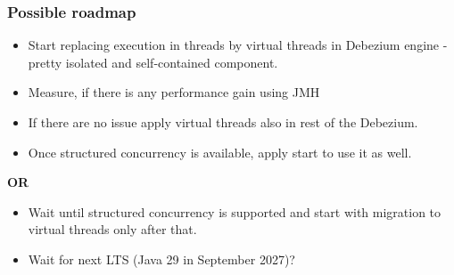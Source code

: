\documentclass[10pt,utf8]{beamer}
\begin{document}
\begin{frame}
    \frametitle{Possible roadmap}
    \begin{itemize}
        \item Start replacing execution in threads by virtual threads in Debezium engine - pretty isolated and self-contained component.
        \item Measure, if there is any performance gain using JMH
        \item If there are no issue apply virtual threads also in rest of the Debezium.
        \item Once structured concurrency is available, apply start to use it as well.
    \end{itemize}
    
    \vspace{0.5cm}
    \centering \textbf{OR}
    \vspace{0.5cm}
    
    \begin{itemize}
        \item Wait until structured concurrency is supported and start with migration to virtual threads only after that.
        \item Wait for next LTS (Java 29 in September 2027)?
    \end{itemize}
\end{frame}



\end{document}
